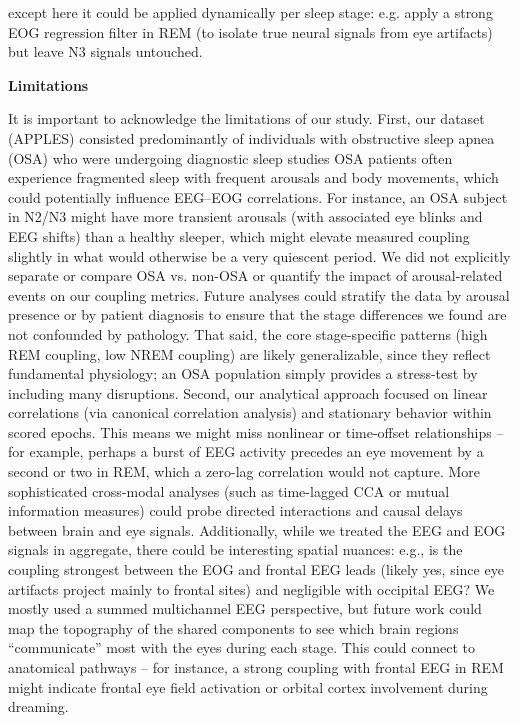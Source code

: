 except here it could be applied dynamically per sleep stage: e.g. apply a strong EOG regression filter in REM (to isolate true neural signals from eye artifacts) but leave N3 signals untouched. 

\textbf{Limitations}

It is important to acknowledge the limitations of our study. First, our dataset (APPLES) consisted predominantly of individuals with obstructive sleep apnea (OSA) who were undergoing diagnostic sleep studies %
OSA patients often experience fragmented sleep with frequent arousals and body movements, which could potentially influence EEG–EOG correlations. For instance, an OSA subject in N2/N3 might have more transient arousals (with associated eye blinks and EEG shifts) than a healthy sleeper, which might elevate measured coupling slightly in what would otherwise be a very quiescent period. We did not explicitly separate or compare OSA vs. non-OSA or quantify the impact of arousal-related events on our coupling metrics. Future analyses could stratify the data by arousal presence or by patient diagnosis to ensure that the stage differences we found are not confounded by pathology. That said, the core stage-specific patterns (high REM coupling, low NREM coupling) are likely generalizable, since they reflect fundamental physiology; an OSA population simply provides a stress-test by including many disruptions. Second, our analytical approach focused on linear correlations (via canonical correlation analysis) and stationary behavior within scored epochs. This means we might miss nonlinear or time-offset relationships – for example, perhaps a burst of EEG activity precedes an eye movement by a second or two in REM, which a zero-lag correlation would not capture. More sophisticated cross-modal analyses (such as time-lagged CCA or mutual information measures) could probe directed interactions and causal delays between brain and eye signals. Additionally, while we treated the EEG and EOG signals in aggregate, there could be interesting spatial nuances: e.g., is the coupling strongest between the EOG and frontal EEG leads (likely yes, since eye artifacts project mainly to frontal sites) and negligible with occipital EEG? We mostly used a summed multichannel EEG perspective, but future work could map the topography of the shared components to see which brain regions “communicate” most with the eyes during each stage. This could connect to anatomical pathways – for instance, a strong coupling with frontal EEG in REM might indicate frontal eye field activation or orbital cortex involvement during dreaming.


